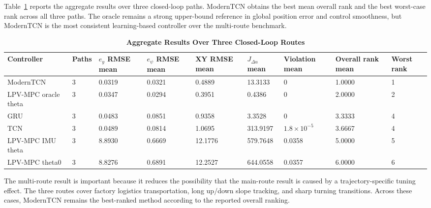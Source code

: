 \documentclass[twocolumn]{article}
\begin{document}
Table~\ref{tab:multipath_aggregate} reports the aggregate results over three closed-loop paths. ModernTCN obtains the best mean overall rank and the best worst-case rank across all three paths. The oracle remains a strong upper-bound reference in global position error and control smoothness, but ModernTCN is the most consistent learning-based controller over the multi-route benchmark.

\begin{table}[!t]

\caption{\textbf{Aggregate Results Over Three Closed-Loop Routes}}

\label{tab:multipath_aggregate}

\setlength{\tabcolsep}{4pt}

\begin{tabular}{|p{105pt}|p{36pt}|p{50pt}|p{50pt}|p{50pt}|p{55pt}|p{48pt}|p{54pt}|p{54pt}|}

\hline

Controller & Paths & $e_y$ RMSE mean & $e_{\psi}$ RMSE mean & XY RMSE mean & $J_{\Delta u}$ mean & Violation mean & Overall rank mean & Worst rank \\

\hline

ModernTCN & 3 & 0.0319 & 0.0321 & 0.4889 & 13.3133 & 0 & 1.0000 & 1 \\

LPV-MPC oracle theta & 3 & 0.0347 & 0.0294 & 0.3951 & 0.4386 & 0 & 2.0000 & 2 \\

GRU & 3 & 0.0483 & 0.0851 & 0.9358 & 3.3528 & 0 & 3.3333 & 4 \\

TCN & 3 & 0.0489 & 0.0814 & 1.0695 & 313.9197 & $1.8\times10^{-5}$ & 3.6667 & 4 \\

LPV-MPC IMU theta & 3 & 8.8930 & 0.6669 & 12.1776 & 579.7648 & 0.0358 & 5.0000 & 5 \\

LPV-MPC theta0 & 3 & 8.8276 & 0.6891 & 12.2527 & 644.0558 & 0.0357 & 6.0000 & 6 \\

\hline

\end{tabular}

\end{table}

The multi-route result is important because it reduces the possibility that the main-route result is caused by a trajectory-specific tuning effect. The three routes cover factory logistics transportation, long up/down slope tracking, and sharp turning transitions. Across these cases, ModernTCN remains the best-ranked method according to the reported overall ranking.
\end{document}
